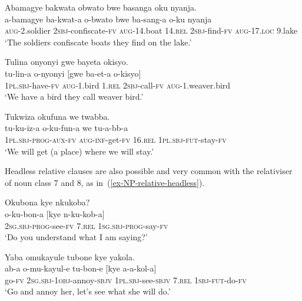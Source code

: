 \ea \label{ex-NP-relative-nonsubject}
\begin{xlist}
\ex 
	\glll  Abamagye bakwata obwato bwe basanga oku nyanja.\\
	a-bamagye ba-kwat-a o-bwato bwe ba-sang-a o-ku nyanja\\
		\textsc{aug}-2.soldier	\textsc{2sbj}-confiscate-\textsc{fv}	\textsc{aug}-14.boat 14.\textsc{rel} \textsc{2sbj}-find-\textsc{fv}  \textsc{aug}-17.\textsc{loc} 9.lake\\
	\glt ‘The soldiers confiscate boats they find on the lake.'

\ex 	\label{ex-NP-relative-nonsubject2}
	\glll Tulina onyonyi gwe bayeta okisyo.\\
		tu-lin-a o-nyonyi [gwe ba-et-a o-kisyo]\\
		1\textsc{pl.sbj}-have-\textsc{fv} \textsc{aug}-1.bird 1.\textsc{rel} \textsc{2sbj}-call-\textsc{fv} \textsc{aug}-1.weaver.bird\\
	\glt `We have a bird they call weaver bird.'

\ex 	\label{ex-NP-relative-nonsubject3}
	\glll Tukwiza okufuna we twabba.\\
		tu-ku-iz-a o-ku-fun-a we tu-a-bb-a\\
		1\textsc{pl.sbj}-\textsc{prog}-\textsc{aux}-\textsc{fv} \textsc{aug}-\textsc{inf}-get-\textsc{fv} 16.\textsc{rel} 1\textsc{pl.sbj}-\textsc{fut}-stay-\textsc{fv}\\
	\glt `We will get (a place) where we will stay.'
\end{xlist}
\z

Headless relative clauses are also possible and very common with the relativiser of noun class 7 and 8, as in~(\ref{ex-NP-relative-headless}).

\ea \label{ex-NP-relative-headless}
\begin{xlist}
\ex	\label{ex-ruulirelativesbj}
	\glll Okubona kye nkukoba?\\
	 o-ku-bon-a [kye n-ku-kob-a]\\
		2\textsc{sg.sbj}-\textsc{prog}-see-\textsc{fv} 7.\textsc{rel} \textsc{1sg.sbj}-\textsc{prog}-say-\textsc{fv}\\
	\glt ‘Do you understand what I am saying?'
	
\ex	
	\glll  Yaba omukayule tubone kye yakola.\\
		ab-a o-mu-kayul-e tu-bon-e [kye a-a-kol-a]\\
		go-\textsc{fv} 2\textsc{sg.sbj}-\textsc{1obj}-annoy-\textsc{sbjv} 1\textsc{pl.sbj}-see-\textsc{sbjv} 7.\textsc{rel} \textsc{1sbj}-\textsc{fut}-do-\textsc{fv}\\
	\glt ‘Go and annoy her, let's see what she will do.'
\end{xlist}
\z

